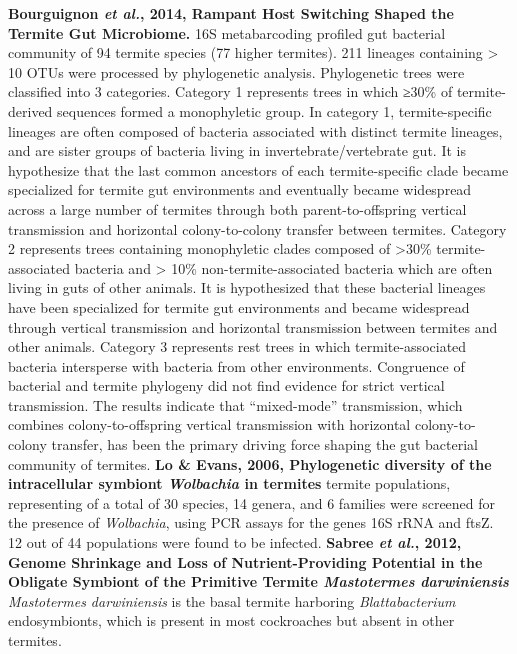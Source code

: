 \documentclass[11pt]{article}
\begin{document}
\begin{sloppypar}
\par
\textbf{Bourguignon \textit{et al.}, 2014, Rampant Host Switching Shaped the Termite Gut Microbiome.} \newline
16S metabarcoding profiled gut bacterial community of 94 termite species (77 higher termites). 
211 lineages containing > 10 OTUs were processed by phylogenetic analysis. 
Phylogenetic trees were classified into 3 categories. 
Category 1 represents trees in which ≥30\% of termite-derived sequences formed a monophyletic group. 
In category 1, termite-specific lineages are often composed of bacteria associated with distinct termite lineages, and are sister groups of bacteria living in invertebrate/vertebrate gut. 
It is hypothesize that the last common ancestors of each termite-specific clade became specialized for termite gut environments and eventually became widespread across a large number of termites through both parent-to-offspring vertical transmission and horizontal colony-to-colony transfer between termites. 
Category 2 represents trees containing monophyletic clades composed of >30\% termite-associated bacteria and > 10\% non-termite-associated bacteria which are often living in guts of other animals. 
It is hypothesized that these bacterial lineages have been specialized for termite gut environments and became widespread through vertical transmission and horizontal transmission between termites and other animals. 
Category 3 represents rest trees in which termite-associated bacteria intersperse with bacteria from other environments. 
Congruence of bacterial and termite phylogeny did not find evidence for strict vertical transmission. 
The results indicate that “mixed-mode” transmission, which combines colony-to-offspring vertical transmission with horizontal colony-to-colony transfer, has been the primary driving force shaping the gut bacterial community of termites.
\textbf{Lo & Evans, 2006, Phylogenetic diversity of the intracellular symbiont \textit{Wolbachia} in termites}   termite populations, representing of a total of 30 species, 14 genera, and 6 families were screened for the presence of \textit{Wolbachia}, using PCR assays for the genes 16S rRNA and ftsZ. 
12 out of 44 populations were found to be infected. 
\textbf{Sabree \textit{et al.}, 2012, Genome Shrinkage and Loss of Nutrient-Providing Potential in the Obligate Symbiont of the Primitive Termite \textit{Mastotermes darwiniensis}} \newline
\textit{Mastotermes darwiniensis} is the basal termite harboring \textit{Blattabacterium} endosymbionts, which is present in most cockroaches but absent in other termites. 

\end{sloppypar}
\end{document}
